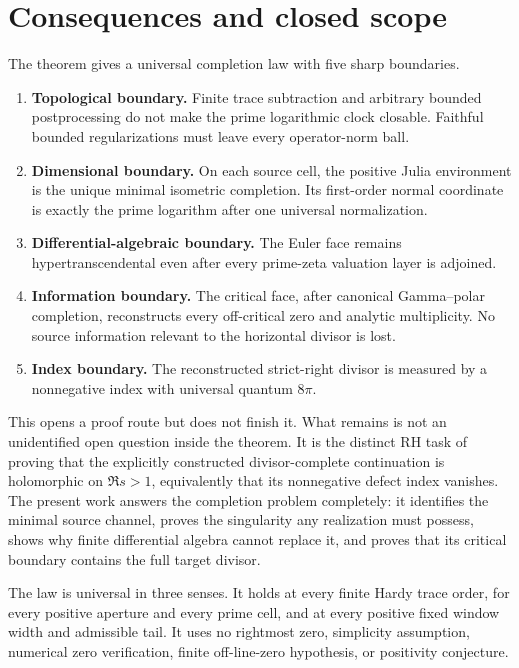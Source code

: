 \documentclass[11pt]{article}
\theoremstyle{definition}
\theoremstyle{remark}
\begin{document}
\section{Consequences and closed scope}\label{sec:scope}

The theorem gives a universal completion law with five sharp boundaries.

\begin{enumerate}[label=\textup{(\arabic*)}]
\item \textbf{Topological boundary.}  Finite trace subtraction and arbitrary bounded
postprocessing do not make the prime logarithmic clock closable.  Faithful bounded
regularizations must leave every operator-norm ball.
\item \textbf{Dimensional boundary.}  On each source cell, the positive Julia environment is
the unique minimal isometric completion.  Its first-order normal coordinate is exactly the
prime logarithm after one universal normalization.
\item \textbf{Differential-algebraic boundary.}  The Euler face remains
hypertranscendental even after every prime-zeta valuation layer is adjoined.
\item \textbf{Information boundary.}  The critical face, after canonical Gamma--polar
completion, reconstructs every off-critical zero and analytic multiplicity.  No source
information relevant to the horizontal divisor is lost.
\item \textbf{Index boundary.}  The reconstructed strict-right divisor is measured by a
nonnegative index with universal quantum \(8\pi\).
\end{enumerate}

This opens a proof route but does not finish it.  What remains is not an unidentified open
question inside the theorem.  It is the distinct RH task of proving that the explicitly
constructed divisor-complete continuation is holomorphic on \(\Re s>1\), equivalently that its
nonnegative defect index vanishes.  The present work answers the completion problem completely:
it identifies the minimal source channel, proves the singularity any realization must possess,
shows why finite differential algebra cannot replace it, and proves that its critical boundary
contains the full target divisor.

The law is universal in three senses.  It holds at every finite Hardy trace order, for every
positive aperture and every prime cell, and at every positive fixed window width and admissible
tail.  It uses no rightmost zero, simplicity assumption, numerical zero verification, finite
off-line-zero hypothesis, or positivity conjecture.
\end{document}
